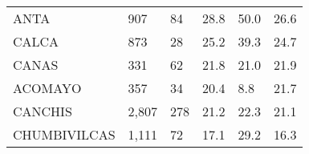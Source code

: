\begin{tabular}{llllll}
	\cellcolor[HTML]{FF5050}ANTA                                   & 907                                                                   & 84                                                               & 28.8                                                                             & 50.0                                                                        & 26.6                                                                                \\
	\cellcolor[HTML]{F8CBAD}CALCA                                  & 873                                                                   & 28                                                               & 25.2                                                                             & 39.3                                                                        & 24.7                                                                                \\
	\cellcolor[HTML]{F8CBAD}CANAS                                  & 331                                                                   & 62                                                               & 21.8                                                                             & 21.0                                                                        & 21.9                                                                                \\
	\cellcolor[HTML]{F8CBAD}ACOMAYO                                & 357                                                                   & 34                                                               & 20.4                                                                             & 8.8                                                                         & 21.7                                                                                \\
	\cellcolor[HTML]{F8CBAD}CANCHIS                                & 2,807                                                                 & 278                                                              & 21.2                                                                             & 22.3                                                                        & 21.1                                                                                \\
	\cellcolor[HTML]{FFFF99}CHUMBIVILCAS                           & 1,111                                                                 & 72                                                               & 17.1                                                                             & 29.2                                                                        & 16.3                                                                                \\

\end{tabular}
